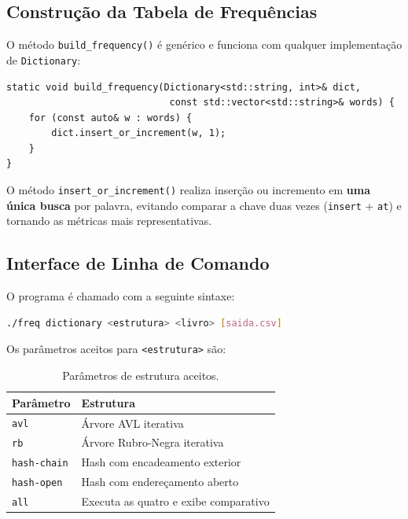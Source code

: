 \documentclass[12pt, a4paper]{article}
\begin{document}
\subsection{Construção da Tabela de Frequências}

O método \texttt{build\_frequency()} é genérico e funciona com qualquer implementação
de \texttt{Dictionary}:

\begin{lstlisting}[caption={Construção da tabela de frequências.}]
static void build_frequency(Dictionary<std::string, int>& dict,
                             const std::vector<std::string>& words) {
    for (const auto& w : words) {
        dict.insert_or_increment(w, 1);
    }
}
\end{lstlisting}

O método \texttt{insert\_or\_increment()} realiza inserção ou incremento em
\textbf{uma única busca} por palavra, evitando comparar a chave duas vezes
(\texttt{insert} + \texttt{at}) e tornando as métricas mais representativas.

\subsection{Interface de Linha de Comando}

O programa é chamado com a seguinte sintaxe:

\begin{lstlisting}[language=bash, caption={Sintaxe de uso do programa.}]
./freq dictionary <estrutura> <livro> [saida.csv]
\end{lstlisting}

Os parâmetros aceitos para \texttt{<estrutura>} são:

\begin{table}[H]
\centering
\caption{Parâmetros de estrutura aceitos.}
\begin{tabular}{ll}
\toprule
\textbf{Parâmetro} & \textbf{Estrutura} \\
\midrule
\texttt{avl}        & Árvore AVL iterativa \\
\texttt{rb}         & Árvore Rubro-Negra iterativa \\
\texttt{hash-chain} & Hash com encadeamento exterior \\
\texttt{hash-open}  & Hash com endereçamento aberto \\
\texttt{all}        & Executa as quatro e exibe comparativo \\
\bottomrule
\end{tabular}
\end{table}
\end{document}
